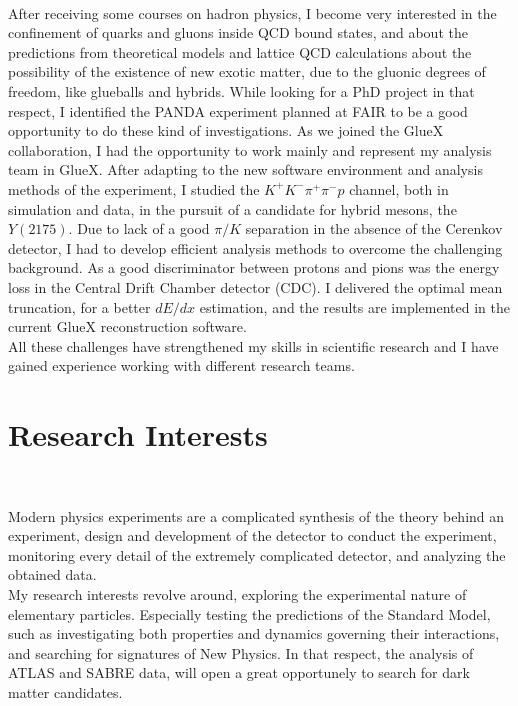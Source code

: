 \documentclass[a4paper,roman]{article}
\begin{document}
~\par After receiving some courses on hadron physics, I become very interested in the confinement of quarks and gluons inside QCD bound states, and about the predictions from theoretical models and lattice QCD calculations about the possibility of the existence of new exotic matter, due to the gluonic degrees of freedom, like glueballs and hybrids. While looking for a PhD project in that respect, I identified the PANDA experiment planned at FAIR to be a good opportunity to do these kind of investigations. As we joined the GlueX collaboration, I had the opportunity to work mainly and represent my analysis team in GlueX. After adapting to the new software environment and analysis methods of the experiment, I studied the $K^{+}K^{-}\pi^{+}\pi^{-}p$ channel, both in simulation and data, in the pursuit of a candidate for hybrid mesons, the $Y(2175)$. Due to lack of a good $\pi/K$ separation in the absence of the Cerenkov detector, I had to develop efficient analysis methods to overcome the challenging background. As a good discriminator between protons and pions was the energy loss in the Central Drift Chamber detector (CDC). I delivered the optimal mean truncation, for a better $dE/dx$ estimation, and the results are implemented in the current GlueX reconstruction software.\\
All these challenges have strengthened my skills in scientific research and I have gained experience working with different research teams.

\section*{Research Interests}
~\par Modern physics experiments are a complicated synthesis of the theory behind an experiment, design and development of the detector to conduct the experiment, monitoring every detail of the extremely complicated detector, and analyzing the obtained data.\\
My research interests revolve around, exploring the experimental nature of elementary particles. Especially testing the predictions of the Standard Model, such as investigating both properties and dynamics governing their interactions, and searching for signatures of New Physics. In that respect, the analysis of ATLAS and SABRE data, will open a great opportunely to search for dark matter candidates.
\end{document}
